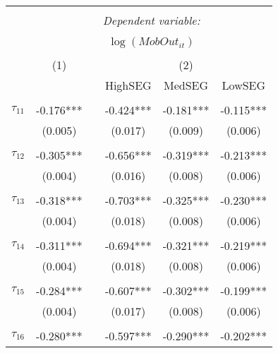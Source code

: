 \begin{tabular}{@{\extracolsep{-5pt}}lccccc} 
\\[-1.8ex]\hline 
\hline \\[-1.8ex] 
 & \multicolumn{5}{c}{\textit{Dependent variable:}} \\ 
\cline{2-6} 
\\[-1.8ex] & \multicolumn{5}{c}{$\log(MobOut_{it})$}\\ 
\\[-1.8ex] & (1) && \multicolumn{3}{c}{(2)} \\ 
\cline{2-2}\cline{4-6}
        &&& HighSEG & MedSEG & LowSEG  \\
 \\[-1.8ex] 
$\tau_{11}$     & -0.176*** && -0.424*** & -0.181*** & -0.115*** \\
                &  (0.005)  &&  (0.017)  &  (0.009)  &  (0.006)  \\
                &           &&           &           &           \\[-2.1ex]
$\tau_{12}$     & -0.305*** && -0.656*** & -0.319*** & -0.213*** \\
                &  (0.004)  &&  (0.016)  &  (0.008)  &  (0.006)  \\
                &           &&           &           &           \\[-2.1ex]
$\tau_{13}$     & -0.318*** && -0.703*** & -0.325*** & -0.230*** \\
                &  (0.004)  &&  (0.018)  &  (0.008)  &  (0.006)  \\
                &           &&           &           &           \\[-2.1ex]
$\tau_{14}$     & -0.311*** && -0.694*** & -0.321*** & -0.219*** \\
                &  (0.004)  &&  (0.018)  &  (0.008)  &  (0.006)  \\
                &           &&           &           &           \\[-2.1ex]
$\tau_{15}$     & -0.284*** && -0.607*** & -0.302*** & -0.199*** \\
                &  (0.004)  &&  (0.017)  &  (0.008)  &  (0.006)  \\
                &           &&           &           &           \\[-2.1ex]
$\tau_{16}$     & -0.280*** && -0.597*** & -0.290*** & -0.202*** \\

\end{tabular}
